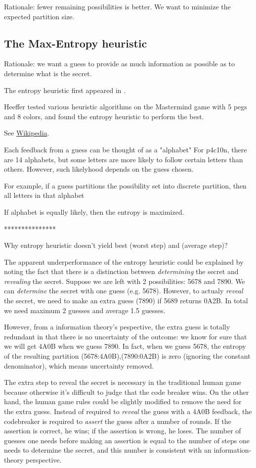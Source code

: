 Rationale: fewer remaining possibilities is better. We want to minimize the expected partition size.

\subsection{The Max-Entropy heuristic}

Rationale: we want a guess to provide as much information as possible as to determine what is the secret.

The entropy heuristic first appeared in \cite{neuwirth81}.

Heeffer \cite{heeffer07} tested various heuristic algorithms on the Mastermind game with 5 pegs and 8 colors, and found the entropy heuristic to perform the best.

See \href{http://en.wikipedia.org/wiki/Entropy\_(information\_theory)\#Further\_properties}{Wikipedia}.

Each feedback from a guess can be thought of as a "alphabet"
For p4c10n, there are 14 alphabets, but some letters are more likely to follow certain letters than others. However, such likelyhood depends on the guess chosen.

For example, if a guess partitions the possibility set into discrete partition, then all letters in that alphabet 

If alphabet is equally likely, then the entropy is maximized.


***************

Why entropy heuristic doesn't yield best (worst step) and (average step)?

The apparent underperformance of the entropy heuristic could be explained by noting the fact that there is a distinction between \emph{determining} the secret and \emph{revealing} the secret. Suppose we are left with 2 possibilities: 5678 and 7890. We can \emph{determine} the secret with one guess (e.g. 5678). However, to actualy \emph{reveal} the secret, we need to make an extra guess (7890) if 5689 returns 0A2B. In total we need maximum 2 guesses and average 1.5 guesses.

However, from a information theory's pespective, the extra guess is totally redundant in that there is no uncertainty of the outcome: we know for sure that we will get 4A0B when we guess 7890. In fact, when we guess 5678, the entropy of the resulting partition {(5678:4A0B),(7890:0A2B)} is zero (ignoring the constant denominator), which means uncertainty removed.

The extra step to reveal the secret is necessary in the traditional human game because otherwise it's difficult to judge that the code breaker wins. On the other hand, the human game rules could be slightly modified to remove the need for the extra guess. Instead of required to \emph{reveal} the guess with a 4A0B feedback, the codebreaker is required to \emph{assert} the guess after a number of rounds. If the assertion is correct, he wins; if the assertion is wrong, he loses. The number of guesses one needs before making an assertion is equal to the number of steps one needs to determine the secret, and this number is consistent with an information-theory perspective.


